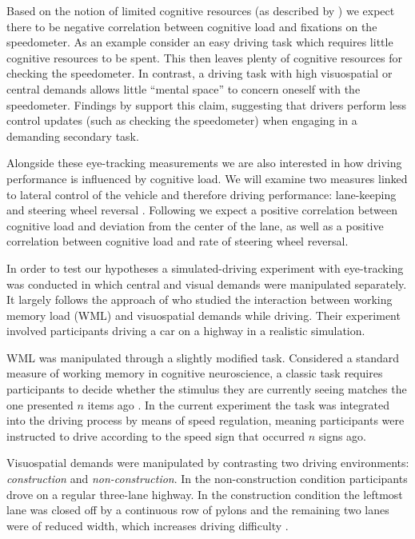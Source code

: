 Based on the notion of limited cognitive resources (as described by \citet{DeWaard1996}) we expect there to be negative correlation between cognitive load and fixations on the speedometer.
As an example consider an easy driving task which requires little cognitive resources to be spent.
This then leaves plenty of cognitive resources for checking the speedometer.
In contrast, a driving task with high visuospatial or central demands allows little ``mental space'' to concern oneself with the speedometer.
Findings by \citet{Salvucci2011} support this claim, suggesting that drivers perform less control updates (such as checking the speedometer) when engaging in a demanding secondary task.

Alongside these eye-tracking measurements we are also interested in how driving performance is influenced by cognitive load.
We will examine two measures linked to lateral control of the vehicle and therefore driving performance: lane-keeping and steering wheel reversal \citep{Knappe2007}. 
Following \citet{Savino2009} we expect a positive correlation between cognitive load and deviation from the center of the lane,
as well as a positive correlation between cognitive load and rate of steering wheel reversal.

In order to test our hypotheses a simulated-driving experiment with eye-tracking was conducted in which central and visual demands were manipulated separately.
It largely follows the approach of \citet{Scheunemann2019} who studied the interaction between working memory load (WML) and visuospatial demands while driving.
Their experiment involved participants driving a car on a highway in a realistic simulation. 

WML was manipulated through a slightly modified \nback task. 
Considered a standard measure of working memory in cognitive neuroscience, a classic \nback task requires participants to decide whether the stimulus they are currently seeing matches the one presented \(n\) items ago \citep{Kane2007}.
In the current experiment the task was integrated into the driving process by means of speed regulation, meaning participants were instructed to drive according to the speed sign that occurred \(n\) signs ago.

Visuospatial demands were manipulated by contrasting two driving environments: \textit{construction} and \textit{non-construction}.
In the non-construction condition participants drove on a regular three-lane highway.
In the construction condition the leftmost lane was closed off by a continuous row of pylons and the remaining two lanes were of reduced width, which increases driving difficulty \citep{Liu2016}.